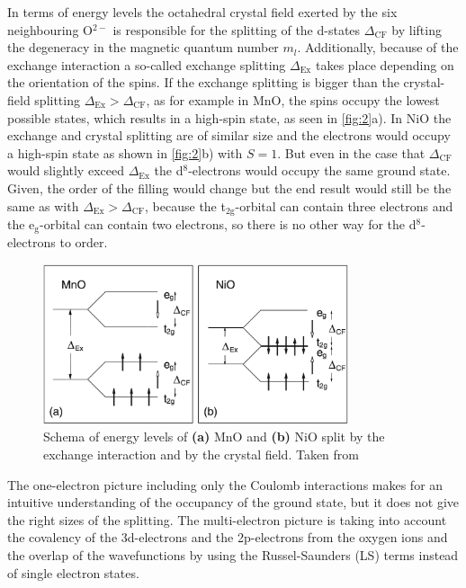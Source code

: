 In terms of energy levels the octahedral crystal field exerted by the six neighbouring O$^{2-}$ is responsible for the splitting of the d-states $\Delta_{\text{CF}}$ by lifting the degeneracy in the magnetic quantum number $m_l$.
Additionally, because of the exchange interaction a so-called exchange splitting $\Delta_{\text{Ex}}$ takes place depending on the orientation of the spins.
If the exchange splitting is bigger than the crystal-field splitting $\Delta_{\text{Ex}} > \Delta_{\text{CF}}$, as for example in MnO, the spins occupy the lowest possible states, which results in a high-spin state, as seen in \autoref{fig:2}a).
In NiO the exchange and crystal splitting are of similar size and the electrons would occupy a high-spin state as shown in \autoref{fig:2}b) with $S=1$. But even in the case that $\Delta_{\text{CF}}$ would slightly exceed $\Delta_{\text{Ex}}$ the d$^8$-electrons would occupy the same ground state.
Given, the order of the filling would change but the end result would still be the same as with $\Delta_{\text{Ex}} > \Delta_{\text{CF}}$, because the t$_{\text{2g}}$-orbital can contain three electrons and the e$_{\text{g}}$-orbital can contain two electrons, so there is no other way for the d$^8$-electrons to order.
\begin{figure}[ht]
    \centering
    \includegraphics[width=0.8\textwidth]{pictures/2.png}
    \caption{Schema of energy levels of \textbf{(a)} MnO and \textbf{(b)} NiO split by the exchange interaction and by the crystal field. Taken from }
    \label{fig:2}
\end{figure}
\FloatBarrier
The one-electron picture including only the Coulomb interactions makes for an intuitive understanding of the occupancy of the ground state, but it does not give the right sizes of the splitting.
The multi-electron picture is taking into account the covalency of the 3d-electrons and the 2p-electrons from the oxygen ions and the overlap of the wavefunctions by using the Russel-Saunders (LS) terms instead of single electron states.
